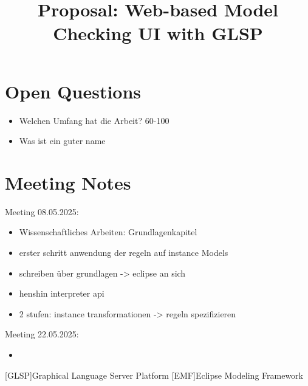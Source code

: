 \documentclass[conference,onecolumn]{IEEEtran}
\begin{document}
  \title{Proposal: Web-based Model Checking UI with GLSP}

  \author{
    }

  \maketitle

  \IEEEpeerreviewmaketitle

  \section{Open Questions}

  \begin{itemize}
    \item Welchen Umfang hat die Arbeit? 60-100
    \item Was ist ein guter name
  \end{itemize}

  \section{Meeting Notes}

  Meeting 08.05.2025:
  \begin{itemize}
    \item Wissenschaftliches Arbeiten: Grundlagenkapitel
    \item erster schritt anwendung der regeln auf instance Models
    \item schreiben über grundlagen -> eclipse an sich
    \item henshin interpreter api
    \item 2 stufen: instance transformationen -> regeln spezifizieren
  \end{itemize}

  Meeting 22.05.2025:
  \begin{itemize}
    \item 
  \end{itemize}


  \printbibliography

  \begin{acronym}
    [GLSP]{Graphical Language Server Platform}
    [EMF]{Eclipse Modeling Framework}

  \end{acronym}
\end{document}

